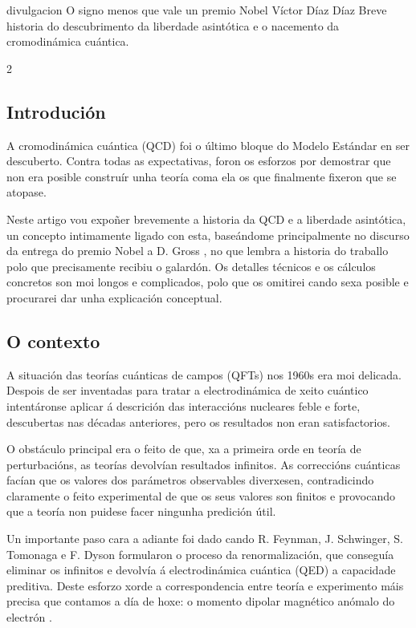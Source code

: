 \Artigo%
{divulgacion}%
{O signo menos que vale un premio Nobel}%
{Víctor Díaz Díaz}%
{Breve historia do descubrimento da liberdade asintótica e o nacemento da cromodinámica cuántica.}%

\begin{multicols}{2}

\subsection*{Introdución}

A cromodinámica cuántica (QCD) foi o último bloque do Modelo Estándar en ser
descuberto. Contra todas as expectativas, foron os esforzos por demostrar que
non era posible construír unha teoría coma ela os que finalmente fixeron que se
atopase.

Neste artigo vou expoñer brevemente a historia da QCD e a liberdade asintótica,
un concepto intimamente ligado con esta, baseándome principalmente no discurso
da entrega do premio Nobel a D. Gross \cite{GrossNobel}, no que lembra a
historia do traballo polo que precisamente recibiu o galardón. Os detalles
técnicos e os cálculos concretos son moi longos e complicados, polo que os
omitirei cando sexa posible e procurarei dar unha explicación conceptual.

\subsection*{O contexto}

A situación das teorías cuánticas de campos (QFTs) nos 1960s era moi delicada.
Despois de ser inventadas para tratar a electrodinámica de xeito cuántico
intentáronse aplicar á descrición das interaccións nucleares feble e forte,
descubertas nas décadas anteriores, pero os resultados non eran satisfactorios.

O obstáculo principal era o feito de que, xa a primeira orde en teoría de
perturbacións, as teorías devolvían resultados infinitos. As correccións
cuánticas facían que os valores dos parámetros observables diverxesen,
contradicindo claramente o feito experimental de que os seus valores son
finitos e provocando que a teoría non puidese facer ningunha predición útil.

Un importante paso cara a adiante foi dado cando R. Feynman, J. Schwinger, S.
Tomonaga e F. Dyson formularon o proceso da renormalización, que conseguía
eliminar os infinitos e devolvía á electrodinámica cuántica (QED) a capacidade
preditiva. Deste esforzo xorde a correspondencia entre teoría e experimento
máis precisa que contamos a día de hoxe: o momento dipolar magnético anómalo do
electrón \cite{g_exp, g_teor}.


\end{multicols}
